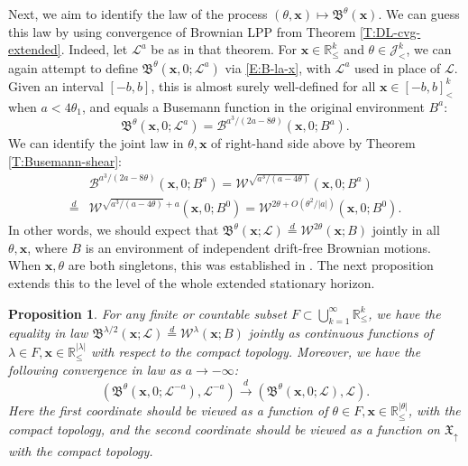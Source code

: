 \documentclass[11pt]{article}
\newcommand{\R}{\mathbb{R}}
\newcommand{\la}{\lambda}
\newcommand{\cB}{\mathcal{B}}
\newcommand{\cJ}{\mathcal{J}}
\newcommand{\cL}{\mathcal{L}}
\newcommand{\cW}{\mathcal{W}}
\newcommand{\fB}{\mathfrak{B}}
\newcommand{\eqd}{\stackrel{d}{=}}
\newcommand{\cvgd}{\stackrel{d}{\to}}
\newcommand{\bx}{\mathbf{x}}
\newtheorem{proposition}[theorem]{Proposition}
\theoremstyle{definition} %
\theoremstyle{remark} %
\begin{document}
Next, we aim to identify the law of the process $(\theta, \bx) \mapsto \fB^\theta(\bx)$. We can guess this law by using convergence of Brownian LPP from Theorem \ref{T:DL-cvg-extended}. Indeed, let $\cL^a$ be as in that theorem. For $\bx \in \R^k_\le$ and $\theta \in \cJ^k_<$, we can again attempt to define $\fB^\theta(\bx, 0; \cL^{a})$ via \eqref{E:B-la-x}, with $\cL^{a}$ used in place of $\cL$. Given an interval $[-b, b]$, this is almost surely well-defined for all $\bx \in [-b, b]^k_<$ when $a < 4 \theta_1$, and equals a Busemann function in the original environment $B^{a}$:
$$
\fB^\theta(\bx, 0; \cL^{a}) = \cB^{a^3/(2a - 8\theta)}(\bx, 0; B^{a}).
$$ 
We can identify the joint law in $\theta, \bx$ of right-hand side above by Theorem \ref{T:Busemann-shear}:
\begin{equation}
	\label{E:cB-nn}
	\begin{split}
&\cB^{a^3/(2a - 8\theta)}(\bx, 0; B^{a}) = \cW^{\sqrt{a^3/(a - 4\theta)}}(\bx, 0; B^{a})  \\
\eqd &\cW^{\sqrt{a^3/(a - 4\theta)} + a}(\bx, 0; B^0)
= \cW^{2 \theta + O(\theta^2/|a|)}(\bx, 0; B^0).
	\end{split}
\end{equation}
In other words, we should expect that $\fB^\theta(\bx; \cL) \eqd \cW^{2 \theta}(\bx ; B)$ jointly in all $\theta, \bx$, where $B$ is an environment of independent drift-free Brownian motions. When $\bx, \theta$ are both singletons, this was established in \cite[Theorem 5.3(iii)]{busani2024stationary}. The next proposition extends this to the level of the whole extended stationary horizon.
\begin{proposition}
	\label{P:landscape-law}
For any finite or countable subset $F \subset \bigcup_{k=1}^\infty \R^k_\le$, we have the equality in law
$
\fB^{\la/2}(\bx ; \cL) \eqd \cW^\la(\bx ; B)
$
jointly as continuous functions of $\la \in F, \bx \in \R^{|\la|}_\le$ with respect to the compact topology. Moreover, we have the following convergence in law as $a \to -\infty$:
\begin{equation}
\label{E:cvg-law-B-theta}
(\fB^\theta(\bx, 0; \cL^{-a}), \cL^{-a}) \cvgd (\fB^\theta(\bx, 0; \cL), \cL).
\end{equation}
Here the first coordinate should be viewed as a function of $\theta \in F, \bx \in \R^{|\theta|}_\le$, with the compact topology, and the second coordinate should be viewed as a function on $\mathfrak X_\uparrow$ with the compact topology.
\end{proposition}
\end{document}
